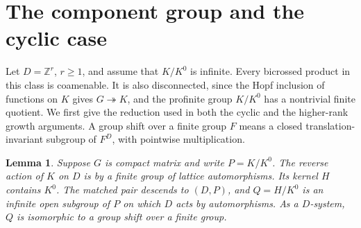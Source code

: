 \documentclass[11pt,a4paper]{article}
\newtheorem{lem}[thm]{Lemma}
\theoremstyle{remark}
\begin{document}
\section{The component group and the cyclic case}\label{seccomponent}

Let $D=\mathbb Z^r$, $r\ge1$, and assume that $K/K^0$ is infinite.
Every bicrossed product in this class is coamenable. It is also
disconnected, since the Hopf inclusion of functions on $K$ gives $G\twoheadrightarrow K$, and the profinite group $K/K^0$
has a nontrivial finite quotient. We first give the reduction used in
both the cyclic and the higher-rank growth arguments. A group shift
over a finite group $F$ means a closed translation-invariant subgroup
of $F^D$, with pointwise multiplication.

\begin{lem}\label{shiftmodel}
Suppose $G$ is compact matrix and write $P=K/K^0$. The reverse action
of $K$ on $D$ is by a finite group of lattice automorphisms. Its kernel
$H$ contains $K^0$. The matched pair descends to $(D,P)$, and
$Q=H/K^0$ is an infinite open subgroup of $P$ on which $D$ acts by
automorphisms. As a $D$-system, $Q$ is isomorphic to a group shift over
a finite group.
\end{lem}
\end{document}
